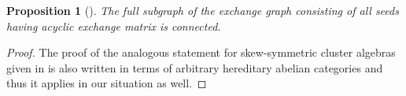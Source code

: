 \documentclass[12pt]{amsart}
\newtheorem{proposition}[theorem]{Proposition}
\begin{document}
  \begin{proposition}[{\cite[Conjecture 4.14(4)]{FZ03}}]
    The full subgraph of the exchange graph consisting of all seeds having acyclic exchange matrix is connected.
  \end{proposition}
  \begin{proof}
    The proof of the analogous statement for skew-symmetric cluster algebras given in \cite[Corollary 4]{caldero-keller2} is also written in terms of arbitrary hereditary abelian categories and thus it applies in our situation as well.
  \end{proof}



\end{document}
